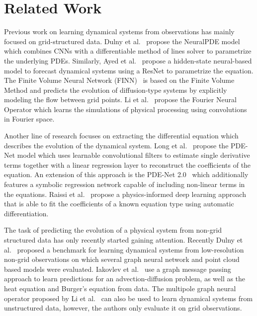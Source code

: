 \documentclass[runningheads]{llncs}
\begin{document}
\section{Related Work}
Previous work on learning dynamical systems from observations has mainly focused on grid-structured data.
Dulny et al.~\cite{dulny2022neuralpde} propose the NeuralPDE model which combines CNNs with a differentiable method of lines solver to parametrize the underlying PDEs.
Similarly, Ayed et al.~\cite{Ayed2019} propose a hidden-state neural-based model to forecast dynamical systems using a ResNet to parametrize the equation.
The Finite Volume Neural Network (FINN)~\cite{praditia2021finite} is based on the Finite Volume Method and predicts the evolution of diffusion-type systems by explicitly modeling the flow between grid points.
Li et al.~\cite{Li2021} propose the Fourier Neural Operator which learns the simulations of physical processing using convolutions in Fourier space.

Another line of research focuses on extracting the differential equation which describes the evolution of the dynamical system.
Long et al.~\cite{long2018pde} propose the PDE-Net model which uses learnable convolutional filters to estimate single derivative terms together with a linear regression layer to reconstruct the coefficients of the equation.
An extension of this approach is the PDE-Net 2.0~\cite{long2019pde} which additionally features a symbolic regression network capable of including non-linear terms in the equations.
Raissi et al.~\cite{Raissi2017} propose a physics-informed deep learning approach that is able to fit the coefficients of a known equation type using automatic differentiation.

The task of predicting the evolution of a physical system from non-grid structured data has only recently started gaining attention.
Recently Dulny et al.~\cite{dulny2023dynabench} proposed a benchmark for learning dynamical systems from low-resolution non-grid observations on which several graph neural network and point cloud~\cite{zhao2021point} based models were evaluated.
Iakovlev et al.~\cite{iakovlev2020learning} use a graph message passing approach to learn predictions for an advection-diffusion problem, as well as the heat equation and Burger's equation from data.
The multipole graph neural operator proposed by Li et al.~\cite{Li2020} can also be used to learn dynamical systems from unstructured data, however, the authors only evaluate it on grid observations.
\end{document}
